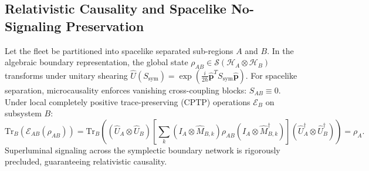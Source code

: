 \documentclass[11pt,onecolumn]{article}
\begin{document}
\subsection{Relativistic Causality and Spacelike No-Signaling Preservation}
Let the fleet be partitioned into spacelike separated sub-regions $A$ and $B$. In the algebraic boundary representation, the global state $\rho_{AB} \in \mathcal{S}(\mathcal{H}_A \otimes \mathcal{H}_B)$ transforms under unitary shearing $\hat{U}(S_{\text{sym}}) = \exp\left( \frac{i}{2\hbar} \hat{\mathbf{p}}^T S_{\text{sym}} \hat{\mathbf{p}} \right)$. For spacelike separation, microcausality enforces vanishing cross-coupling blocks: $S_{AB} \equiv 0$. Under local completely positive trace-preserving (CPTP) operations $\mathcal{E}_B$ on subsystem $B$:
\begin{equation}
    \mathrm{Tr}_B\left( \mathcal{E}_{AB}(\rho_{AB}) \right) = \mathrm{Tr}_B\left( (\hat{U}_A \otimes \hat{U}_B) \left[ \sum_k (I_A \otimes \hat{M}_{B,k}) \rho_{AB} (I_A \otimes \hat{M}_{B,k}^\dagger) \right] (\hat{U}_A^\dagger \otimes \hat{U}_B^\dagger) \right) = \rho_A.
    \label{eq:latex_no_signaling}
\end{equation}
Superluminal signaling across the symplectic boundary network is rigorously precluded, guaranteeing relativistic causality.
\end{document}
